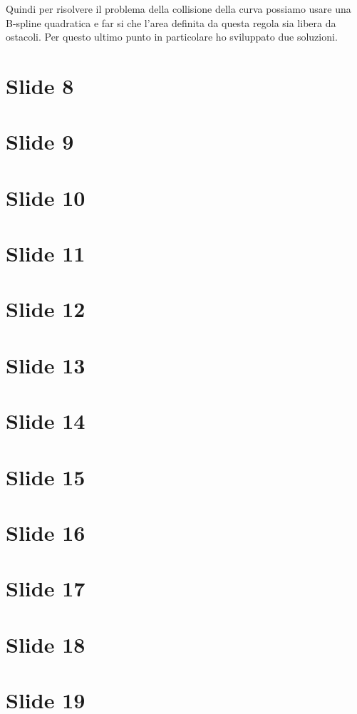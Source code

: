\documentclass{article}
\begin{document}
Quindi per risolvere il problema della collisione della curva possiamo
usare una B-spline quadratica e far si che l'area definita da questa
regola sia libera da ostacoli. Per questo ultimo punto in particolare
ho sviluppato due soluzioni.

\section*{Slide 8}

\section*{Slide 9}

\section*{Slide 10}

\section*{Slide 11}

\section*{Slide 12}

\section*{Slide 13}

\section*{Slide 14}

\section*{Slide 15}

\section*{Slide 16}

\section*{Slide 17}

\section*{Slide 18}

\section*{Slide 19}
\end{document}
